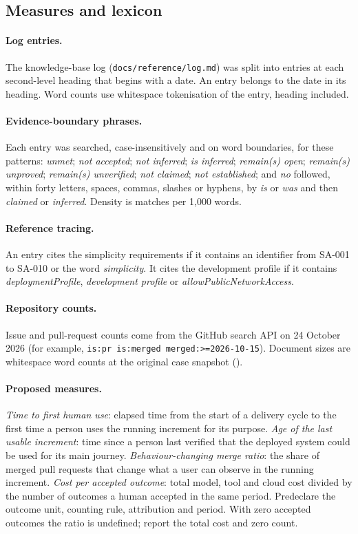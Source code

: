 \subsection{Measures and lexicon}\label{app:measures}

\paragraph{Log entries.} The knowledge-base log
(\texttt{docs/reference/log.md}) was split into entries at each second-level
heading that begins with a date. An entry belongs to the date in its heading.
Word counts use whitespace tokenisation of the entry, heading included.

\paragraph{Evidence-boundary phrases.} Each entry was searched, case-insensitively and
on word boundaries, for these patterns: \emph{unmet}; \emph{not accepted};
\emph{not inferred}; \emph{is inferred}; \emph{remain{(s)} open};
\emph{remain{(s)} unproved}; \emph{remain{(s)} unverified}; \emph{not claimed};
\emph{not established}; and \emph{no} followed, within forty letters, spaces,
commas, slashes or hyphens, by \emph{is} or \emph{was} and then
\emph{claimed} or \emph{inferred}. Density is matches per 1,000 words.

\paragraph{Reference tracing.} An entry cites the simplicity requirements if
it contains an identifier from SA-001 to SA-010 or the word
\emph{simplicity}. It cites the development profile if it contains
\emph{deploymentProfile}, \emph{development profile} or
\emph{allowPublicNetworkAccess}.

\paragraph{Repository counts.} Issue and pull-request counts come from the
GitHub search API on 24 October 2026 (for example,
\texttt{is:pr is:merged merged:>=2026-10-15}). Document sizes are whitespace
word counts at the original case snapshot ().

\paragraph{Proposed measures.} \emph{Time to first human use}: elapsed time
from the start of a delivery cycle to the first time a person uses the running
increment for its purpose\@. \emph{Age of the last usable increment}: time since
a person last verified that the deployed system could be used for its main
journey\@. \emph{Behaviour-changing merge ratio}: the share of merged pull
requests that change what a user can observe in the running increment.
\emph{Cost per accepted outcome}: total model, tool and cloud cost divided by
the number of outcomes a human accepted in the same period. Predeclare the
outcome unit, counting rule, attribution and period. With zero accepted
outcomes the ratio is undefined; report the total cost and zero count.

